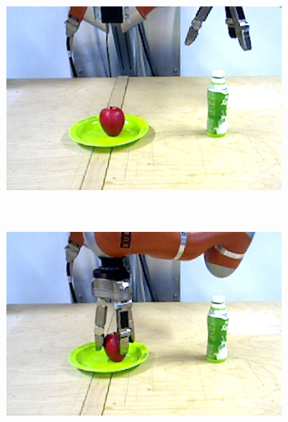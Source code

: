 \begin{figure}[]
  \centering
  \begin{subfigure}[t]{0.475\textwidth}
    \centering
    \includegraphics[width=\textwidth]{./figures/sec/scenario/darktable_exported/frame0493.jpg}
    \label{fig:sec_examplescenario_pickandplace_1j}
  \end{subfigure}
  \hfil
  \begin{subfigure}[t]{0.475\textwidth}
    \centering
    \label{fig:sec_examplescenario_pickandplace_1t}
  \end{subfigure}\\%
  \begin{subfigure}[t]{0.475\textwidth}
    \centering
    \includegraphics[width=\textwidth]{./figures/sec/scenario/darktable_exported/frame0837.jpg}

\end{subfigure}
\end{figure}
